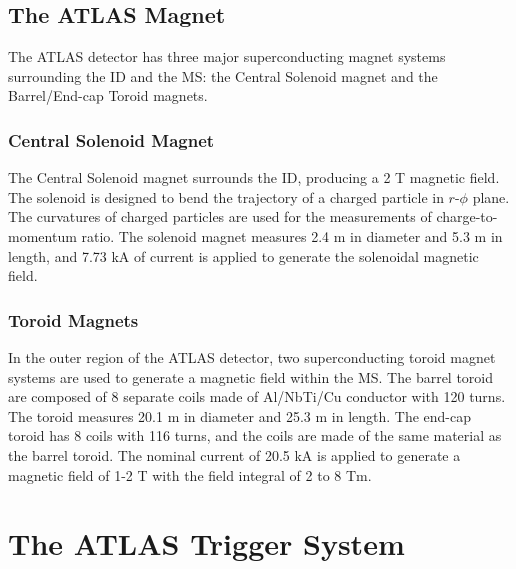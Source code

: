\subsection{The ATLAS Magnet}
\label{sec:atlas:magnet}

The ATLAS detector has three major superconducting magnet systems surrounding the ID and the MS: the Central Solenoid magnet and the Barrel/End-cap Toroid magnets.

\subsubsection{Central Solenoid Magnet}
\label{sec:atlas:solenoid}
The Central Solenoid magnet surrounds the ID, producing a 2 T magnetic field. The solenoid is designed to bend the trajectory of a charged particle in $r$-$\phi$ plane. The curvatures of charged particles are used for the measurements of charge-to-momentum ratio. The solenoid magnet measures 2.4 \si{\meter} in diameter and 5.3 \si{\meter} in length, and 7.73 \si{\kilo\ampere} of current is applied to generate the solenoidal magnetic field.


\subsubsection{Toroid Magnets}
\label{sec:atlas:toroid}

In the outer region of the ATLAS detector, two superconducting toroid magnet systems are used to generate a magnetic field within the MS. The barrel toroid are composed of 8 separate coils made of Al/NbTi/Cu conductor with 120 turns. The toroid measures 20.1 \si{\meter} in diameter and 25.3 \si{\meter} in length. The end-cap toroid has 8 coils with 116 turns, and the coils are made of the same material as the barrel toroid. The nominal current of 20.5 \si{\kilo\ampere} is applied to generate a magnetic field of 1-2 T with the field integral of 2 to 8 Tm.

\section{The ATLAS Trigger System}
\label{sec:atlas:daq}


